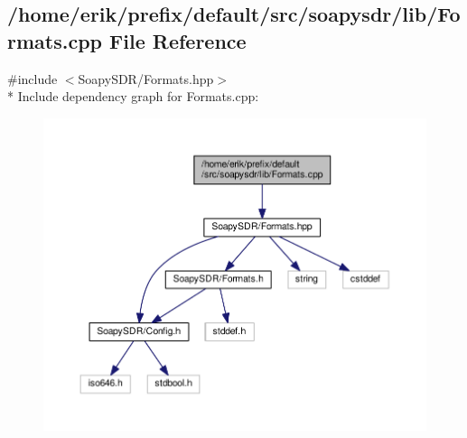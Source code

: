 \subsection{/home/erik/prefix/default/src/soapysdr/lib/\+Formats.cpp File Reference}
\label{Formats_8cpp}
{\ttfamily \#include $<$Soapy\+S\+D\+R/\+Formats.\+hpp$>$}\\*
Include dependency graph for Formats.\+cpp\+:
\nopagebreak
\begin{figure}[H]
\begin{center}
\leavevmode
\includegraphics[width=350pt]{d4/dc4/Formats_8cpp__incl}
\end{center}
\end{figure}
